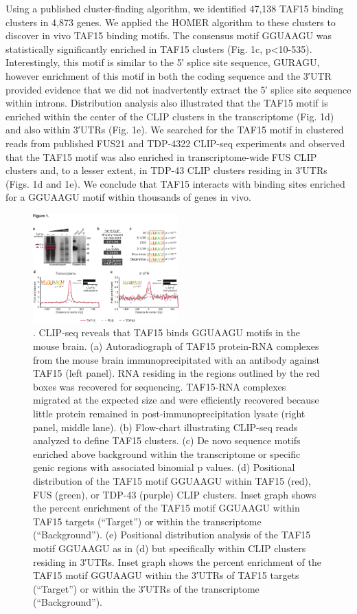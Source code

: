Using a published cluster-finding algorithm\cite{Polymenidou2011}, we identified 47,138 TAF15 binding clusters in 4,873 genes. We applied the HOMER algorithm to these clusters to discover in vivo TAF15 binding motifs. The consensus motif GGUAAGU was statistically significantly enriched in TAF15 clusters (Fig. 1c, p<10-535). Interestingly, this motif is similar to the 5′ splice site sequence, GURAGU\cite{Shapiro1987}, however enrichment of this motif in both the coding sequence and the 3′UTR provided evidence that we did not inadvertently extract the 5′ splice site sequence within introns. Distribution analysis also illustrated that the TAF15 motif is enriched within the center of the CLIP clusters in the transcriptome (Fig. 1d) and also within 3′UTRs (Fig. 1e). We searched for the TAF15 motif in clustered reads from published FUS21 and TDP-4322 CLIP-seq experiments and observed that the TAF15 motif was also enriched in transcriptome-wide FUS CLIP clusters and, to a lesser extent, in TDP-43 CLIP clusters residing in 3′UTRs (Figs. 1d and 1e). We conclude that TAF15 interacts with binding sites enriched for a GGUAAGU motif within thousands of genes in vivo.

\begin{figure}[ht]
  \centering
  \includegraphics[width=0.5\textwidth]{chapter_2_figures/Figure_1}
  \caption[Figure 1]{. CLIP-seq reveals that TAF15 binds GGUAAGU motifs in the mouse brain. (a) Autoradiograph of TAF15 protein-RNA complexes from the mouse brain immunoprecipitated with an antibody against TAF15 (left panel). RNA residing in the regions outlined by the red boxes was recovered for sequencing. TAF15-RNA complexes migrated at the expected size and were efficiently recovered because little protein remained in post-immunoprecipitation lysate (right panel, middle lane). (b) Flow-chart illustrating CLIP-seq reads analyzed to define TAF15 clusters. (c) De novo sequence motifs enriched above background within the transcriptome or specific genic regions with associated binomial p values. (d) Positional distribution of the TAF15 motif GGUAAGU within TAF15 (red), FUS (green), or TDP-43 (purple) CLIP clusters. Inset graph shows the percent enrichment of the TAF15 motif GGUAAGU within TAF15 targets (“Target”) or within the transcriptome (“Background”). (e) Positional distribution analysis of the TAF15 motif GGUAAGU as in (d) but specifically within CLIP clusters residing in 3′UTRs. Inset graph shows the percent enrichment of the TAF15 motif GGUAAGU within the 3′UTRs of TAF15 targets (“Target”) or within the 3′UTRs of the transcriptome (“Background”).}
  \label{fig:Figure_1}
  \end{figure}

